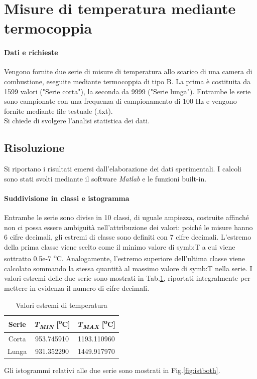 \section{Misure di temperatura mediante termocoppia} \label{sez:misureT}
\paragraph{Dati e richieste}
Vengono fornite due serie di misure di temperatura allo scarico di una camera di combustione, eseguite mediante termocoppia di tipo B. La prima è costituita da 1599 valori ("Serie corta"), la seconda da 9999 ("Serie lunga"). Entrambe le serie sono campionate con una frequenza di campionamento di 100 Hz e vengono fornite mediante file testuale (.txt).\\
Si chiede di svolgere l'analisi statistica dei dati.
\subsection{Risoluzione}
Si riportano i risultati emersi dall'elaborazione dei dati sperimentali. I calcoli sono stati svolti mediante il software \textit{Matlab} e le funzioni built-in.
\paragraph{Suddivisione in classi e istogramma}
Entrambe le serie sono divise in 10 classi, di uguale ampiezza, costruite affinché non ci possa essere ambiguità nell'attribuzione dei valori: poiché le misure hanno 6 cifre decimali, gli estremi di classe sono definiti con 7 cifre decimali. L'estremo della prima classe viene scelto come il minimo valore di \gls{symb:T} a cui viene sottratto 0.5e-7 \textsuperscript{o}C. Analogamente, l'estremo superiore dell'ultima classe viene calcolato sommando la stessa quantità al massimo valore di \gls{symb:T} nella serie. I valori estremi delle due serie sono mostrati in Tab.\ref{tab:estremitemp}, riportati integralmente per mettere in evidenza il numero di cifre decimali.
\begin{table} [H]
	\centering
	\begin{tabular}{c|c|c}
		\toprule
		\toprule
		\textbf{Serie} & \textbf{\textit{T\textsubscript{MIN}} [\textsuperscript{o}C]} &\textbf{\textit{T\textsubscript{MAX}} [\textsuperscript{o}C]} \\
		\midrule
		\midrule
		Corta & 953.745910 & 1193.110960\\
		\midrule
		Lunga & 931.352290 & 1449.917970 \\
		\bottomrule
		\bottomrule
	\end{tabular}
\caption{Valori estremi di temperatura}
\label{tab:estremitemp}
\end{table}
Gli istogrammi relativi alle due serie sono mostrati in Fig.\ref{fig:istboth}.


